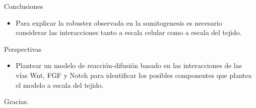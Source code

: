 \documentclass[xcolor=table, xllnames]{beamer}
\begin{document}
\begin{frame}{Conclusiones}
	\begin{itemize}
		\item Para explicar la robustez observada en la somitogenesis es necesario considerar las interacciones tanto a escala celular como a escala del tejido.
	\end{itemize}
	
\end{frame}
	
\begin{frame}{Perspectivas}

	\begin{itemize}
		\item Plantear un modelo de reacción-difusión basado en las interacciones de las vías Wnt, FGF y Notch para identificar los posibles componentes que plantea el modelo a escala del tejido.

\end{itemize}
\end{frame}


\begin{frame}
\Huge{\centerline{Gracias.}}
\end{frame}
\end{document}
